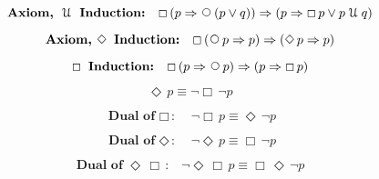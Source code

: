 \documentclass[12pt, fleqn, leqno]{article}
\newcommand{\impl}{\ensuremath{\Rightarrow}}        %
\newcommand{\Until}{\;\mathcal{U}\;}
\newcommand{\Next}{\;\,\text{\raisebox{3.5pt}{\circle{6}}}}
\newcommand{\Event}{\Diamond\,}
\newcommand{\Always}{\Box\,}
\newcommand{\spacer}{\vspace{-30pt}}
\begin{document}
\spacer

\begin{equation}\label{E:untilInduction2}
\textbf{Axiom, $\Until$ Induction:}\quad \Always (p \impl \Next (p\lor q)) \impl (p \impl \Always p\lor p\Until q)
\end{equation}

\spacer

\begin{equation}\label{E:eventInduction}
\textbf{Axiom, $\Event$ Induction:}\quad \Always (\Next p \impl p) \impl (\Event p \impl p)
\end{equation}

\spacer

\begin{equation}\label{E:induction}
\textbf{$\Always$ Induction:}\quad \Always (p \impl \Next p) \impl (p \impl \Always p)
\end{equation}

\spacer

\begin{equation}\label{E:eventAsAlways}
\Event p \equiv \neg\Always\neg p
\end{equation}

\spacer

\begin{equation}\label{E:dualAlways}
\textbf{Dual of $\Always$:}\quad \neg\Always p \equiv \Event\neg p
\end{equation}

\spacer

\begin{equation}\label{E:dualEvent}
\textbf{Dual of $\Event$:}\quad \neg\Event p \equiv \Always\neg p
\end{equation}

\spacer

\begin{equation}\label{E:dualEventAlways}
\textbf{Dual of $\Event \Always$:}\quad \neg \Event\Always p \equiv \Always\Event \neg p
\end{equation}

\spacer
\end{document}
